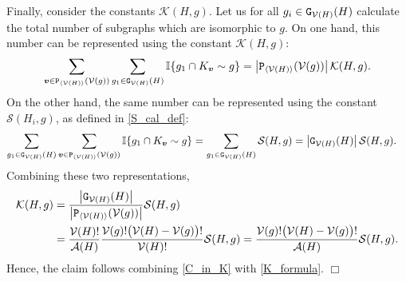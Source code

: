 \documentclass[11pt,reqno]{amsart}
\numberwithin{equation}{section}
\newcommand{\abs}[1]{\left\lvert #1 \right\rvert}
\newcommand{\sprod}[1]{\langle#1\rangle}
\newcommand{\QED}{\hfill $\Box$}
\newcommand{\kb}[1]{\boldsymbol{#1}}
\newcommand{\vk}[1]{\kb{#1}}
\begin{document}
Finally, consider the constants $\mathcal{K}({H},g)$. Let us for all $g_i\in{\tt G}_{\mathcal{V}({H})}({H})$ calculate the total number of subgraphs which are isomorphic to $g$. On one hand, this number can be represented using the constant $\mathcal{K}({H},g)$:
\begin{align*}
    \sum_{\vk v\in{\tt P}_{\sprod{\mathcal{V}({H})}}(\mathcal{V}(g))}\sum_{g_1\in{\tt G}_{\mathcal{V}({H})}({H})}\mathbb{I}\{g_1\cap K_{\vk v}\sim g\} = \abs{{\tt P}_{\sprod{\mathcal{V}({H})}}(\mathcal{V}(g))}\mathcal{K}({H},g).
\end{align*}
On the other hand, the same number can be represented using the constant $\mathcal{S}({H}_i,g)$, as defined in \eqref{S_cal_def}:
\begin{align*}
    \sum_{g_1\in{\tt G}_{\mathcal{V}({H})}({H})}\sum_{\vk v\in{\tt P}_{\sprod{\mathcal{V}({H})}}(\mathcal{V}(g))}\mathbb{I}\{g_1\cap K_{\vk v}\sim g\}&=\sum_{g_1\in{\tt G}_{\mathcal{V}({H})}({H})}\mathcal{S}({H},g)=\abs{{\tt G}_{\mathcal{V}({H})}({H})}\mathcal{S}({H},g).
\end{align*}
Combining these two representations, 
\begin{align}
    \mathcal{K}({H},g)&=\frac{\abs{{\tt G}_{\mathcal{V}({H})}({H})}}{\abs{{\tt P}_{\sprod{\mathcal{V}({H})}}(\mathcal{V}(g))}}\mathcal{S}({H},g)\notag\\
    &=\frac{\mathcal{V}({H})!}{\mathcal{A}({H})}\frac{\mathcal{V}(g)!\bigl(\mathcal{V}({H})-\mathcal{V}(g)\bigr)!}{\mathcal{V}({H})!}\mathcal{S}({H},g)=\frac{\mathcal{V}(g)!\bigl(\mathcal{V}({H})-\mathcal{V}(g)\bigr)!}{\mathcal{A}({H})}\mathcal{S}({H},g).\label{K_formula}
\end{align}
Hence, the claim follows combining \eqref{C_in_K} with \eqref{K_formula}.
\QED


\medskip
\end{document}
